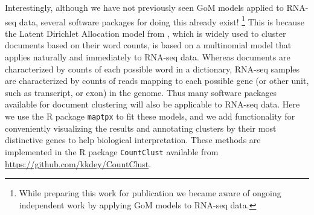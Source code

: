 Interestingly, although we have not previously seen GoM models applied to RNA-seq data, several software packages
for doing this already exist! \footnote{While preparing this work for publication we became aware of ongoing independent work
by \cite{duVerle2016} applying GoM models to RNA-seq data.}
 This is because the 
Latent Dirichlet Allocation model from \cite{Blei2003}, which is widely used to cluster documents based on their word counts, is based on a multinomial model that applies naturally and immediately to RNA-seq data. 
Whereas documents are characterized by counts of each possible word in a dictionary, RNA-seq samples
are characterized by counts of reads mapping to each possible gene (or other unit, such as transcript, or exon) in the genome. 
Thus many software packages available for document clustering will also be applicable to RNA-seq data.
Here we use the R package {\tt maptpx} \cite{Taddy2012} to fit these models, and we add functionality for conveniently visualizing the results and annotating
clusters by their most distinctive genes to help biological interpretation. These methods are implemented in the R package {\tt CountClust} available
from \url{https://github.com/kkdey/CountClust}.  











